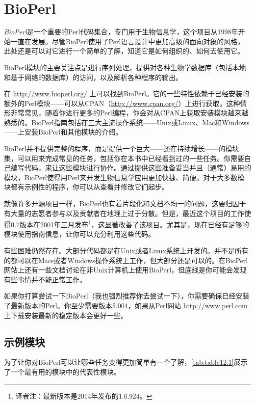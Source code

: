 \section{BioPerl}
\textit{BioPerl}是一个重要的Perl代码集合，专门用于生物信息学，这个项目从1998年开始一直在发展。尽管BioPerl使用了Perl语言设计中更加高级的面向对象的风格，此处还是可以对它进行一个简单的了解，知道它是如何组织的、如何去使用它。

BioPerl模块的主要关注点是进行序列处理，提供对各种生物学数据库（包括本地和基于网络的数据库）的访问，以及解析各种程序的输出。

在 \href{http://www.bioperl.org/}{http://www.bioperl.org/} 上可以找到BioPerl。它的一些特性依赖于已经安装的额外的Perl模块——可以从CPAN（\href{http://www.cpan.org/}{http://www.cpan.org/}）上进行获取。这种情形非常常见，随着你进行更多的Perl编程，你会对从CPAN上获取安装模块越来越熟悉的。BioPerl指南包括在三大主流操作系统——Unix或Linux、Mac和Windows——上安装BioPerl和其他模块的介绍。

BioPerl并不提供完整的程序，而是提供一个巨大——还在持续增长——的模块集，可以用来完成常见的任务，包括你在本书中已经看到过的一些任务。你需要自己编写代码，来让这些模块进行协作。通过提供这些准备妥当并且（通常）易用的模块，BioPerl使得用Perl来开发生物信息学应用更加快捷、简便。对于大多数模块都有示例性的程序，你可以从查看并修改它们起步。

就像许多开源项目一样，BioPerl也有着片段化和文档不均一的问题，这要归因于有大量的志愿者参与以及贡献者在地理上过于分散。但是，最近这个项目的工作使得0.7版本在2001年三月发布\footnote{译者注：最新版本是2014年发布的1.6.924。}，这显著改善了该项目。尤其是，现在已经有足够的模块使用指南信息，让你可以充分利用这些代码。

有些困难仍然存在。大部分代码都是在Unix或者Linux系统上开发的。并不是所有的都可以在Macs或者Windows操作系统上工作，但大部分还是可以的。在BioPerl网站上还有一些文档讨论在非Unix计算机上使用BioPerl，但底线是你可能会发现有些事情并不能正常工作。

如果你打算尝试一下BioPerl（我也强烈推荐你去尝试一下），你需要确保已经安装了最新版本的Perl。你至少需要版本5.004，如果从Perl网站 \href{http://www.perl.com}{http://www.perl.com} 上下载安装最新的稳定版本会更好一些。

\subsection{示例模块}
为了让你对BioPerl可以让哪些任务变得更加简单有一个了解，\autoref{tab:table12.1}展示了一个最有用的模块中的代表性模块。

